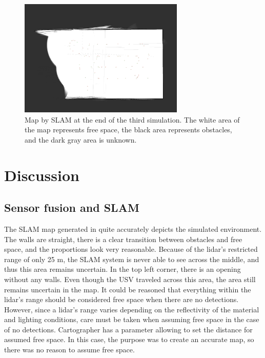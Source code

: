 \begin{figure}[h!]
	\centering
	\includegraphics[width=0.7\textwidth]{fig/simulations/binn_slam}
	\caption[Map by SLAM at the end of the third simulation.]{Map by SLAM at the end of the third simulation. The white area of the map represents free space, the black area represents obstacles, and the dark gray area is unknown.}
	\label{fig:binn_slam}
\end{figure}

\restoregeometry 


\section{Discussion}

\subsection{Sensor fusion and SLAM}

The SLAM map generated in  quite accurately depicts the simulated environment. The walls are straight, there is a clear transition between obstacles and free space, and the proportions look very reasonable. Because of the lidar's restricted range of only 25 m, the SLAM system is never able to see across the middle, and thus this area remains uncertain. In the top left corner, there is an opening without any walls. Even though the USV traveled across this area, the area still remains uncertain in the map. It could be reasoned that everything within the lidar's range should be considered free space when there are no detections. However, since a lidar's range varies depending on the reflectivity of the material and lighting conditions, care must be taken when assuming free space in the case of no detections. Cartographer has a parameter allowing to set the distance for assumed free space. In this case, the purpose was to create an accurate map, so there was no reason to assume free space.

